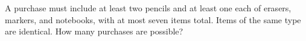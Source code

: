 A purchase must include at least two pencils and at least one each of erasers, markers, and notebooks, with at most seven items total. Items of the same type are identical. How many purchases are possible?
